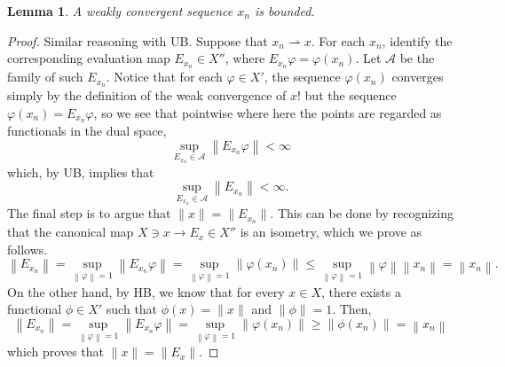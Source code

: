 \documentclass[letterpaper,twoside,11pt]{article}
\theoremstyle{mystyle}
\newtheorem{lemma}[theorem]{Lemma}
\newcommand{\cg}{\color{gray}}
\newcommand{\cbk}{\color{black}}
\begin{document}
\begin{lemma}
  A weakly convergent sequence $x_n$ is bounded. 
\end{lemma}
\begin{proof}
  Similar reasoning with UB. Suppose that $x_n\rightharpoonup x$. For each $x_n$, identify the corresponding evaluation map $E_{x_n}\in X''$, where $E_{x_n}\varphi = \varphi (x_n)$. Let $\mathcal A$ be the family of such $E_{x_n}$. Notice that for each $\varphi \in X'$, the sequence $\varphi(x_n)$ converges \cg simply by the definition of the weak convergence of $x$! \cbk but the sequence $\varphi(x_n) = E_{x_n}\varphi$, so we see that pointwise \cg where here the points are regarded as functionals in the dual space\cbk, 
  \[\mathop {\sup }\limits_{{E_{{x_n}}} \in \mathcal{A}} \left\| {{E_{{x_n}}}\varphi } \right\| < \infty \]
  which, by UB, implies that \[\mathop {\sup }\limits_{{E_{{x_n}}} \in \mathcal{A}} \left\| {{E_{{x_n}}}} \right\| < \infty .\] The final step is to argue that $\|x\| = \|E_{x_n}\|$. This can be done by recognizing that the canonical map $X \ni x \to E_x \in X''$ is an isometry, which we prove as follows. 
  \[\left\| {{E_{{x_n}}}} \right\| = \mathop {\sup }\limits_{\left\| \varphi  \right\| = 1} \left\| {{E_{{x_n}}}\varphi } \right\| = \mathop {\sup }\limits_{\left\| \varphi  \right\| = 1} \left\| {\varphi \left( {{x_n}} \right)} \right\| \leqslant \mathop {\sup }\limits_{\left\| \varphi  \right\| = 1} \left\| \varphi  \right\|\left\| {{x_n}} \right\| = \left\| {{x_n}} \right\|.\]
  On the other hand, by HB, we know that for every $x\in X$, there exists a functional $\phi \in X'$ such that $\phi (x) = \|x\|$ and $\|\phi\|=1$. Then, 
  \[\left\| {{E_{{x_n}}}} \right\| = \mathop {\sup }\limits_{\left\| \varphi  \right\| = 1} \left\| {{E_{{x_n}}}\varphi } \right\| = \mathop {\sup }\limits_{\left\| \varphi  \right\| = 1} \left\| {\varphi \left( {{x_n}} \right)} \right\| \geqslant \left\| {\phi \left( {{x_n}} \right)} \right\| = \left\| {{x_n}} \right\|\]
  which proves that $\|x\|=\|E_x\|$. 
\end{proof}
\end{document}
